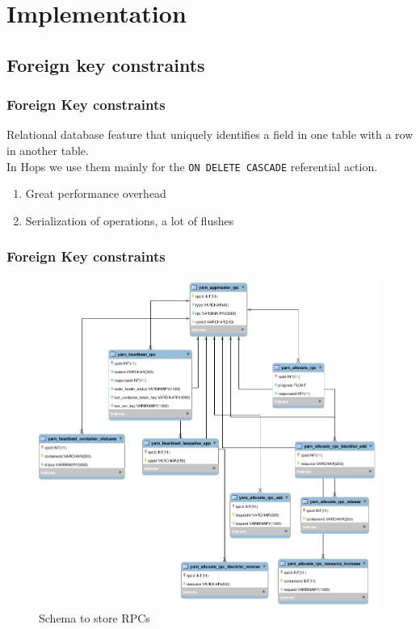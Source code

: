 \documentclass{beamer}
\begin{document}
\section{Implementation}
\subsection{Foreign key constraints}
\begin{frame}
\frametitle{Foreign Key constraints}
Relational database feature that uniquely identifies a field in one
table with a row in another table.\\[2em]

In Hops we use them mainly for the \texttt{ON DELETE CASCADE}
referential action.

\begin{enumerate}
\item {\color{red} Great} performance overhead
\item Serialization of operations, a lot of {\color{red} flushes}
\end{enumerate}
\end{frame}

\begin{frame}
\frametitle{Foreign Key constraints}
\begin{figure}
\centering
\includegraphics[scale=0.18]{resources/hops_yarn_ndb_schema_rpc.png}
\caption{Schema to store RPCs}
\end{figure}
\end{frame}
\end{document}
